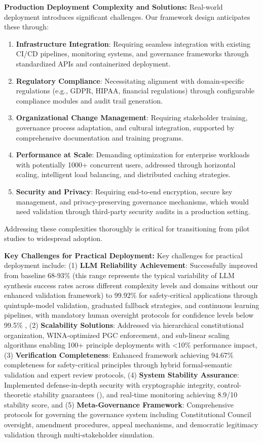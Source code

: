 \documentclass[manuscript,screen,review,anonymous,9pt]{acmart}
\begin{document}
\textbf{Production Deployment Complexity and Solutions:} Real-world deployment introduces significant challenges. Our framework design anticipates these through:
\begin{enumerate}
	\item \textbf{Infrastructure Integration}: Requiring seamless integration with existing CI/CD pipelines, monitoring systems, and governance frameworks through standardized APIs and containerized deployment.
	\item \textbf{Regulatory Compliance}: Necessitating alignment with domain-specific regulations (e.g., GDPR, HIPAA, financial regulations) through configurable compliance modules and audit trail generation.
	\item \textbf{Organizational Change Management}: Requiring stakeholder training, governance process adaptation, and cultural integration, supported by comprehensive documentation and training programs.
	\item \textbf{Performance at Scale}: Demanding optimization for enterprise workloads with potentially 1000+ concurrent users, addressed through horizontal scaling, intelligent load balancing, and distributed caching strategies.
	\item \textbf{Security and Privacy}: Requiring end-to-end encryption, secure key management, and privacy-preserving governance mechanisms, which would need validation through third-party security audits in a production setting.
\end{enumerate}
Addressing these complexities thoroughly is critical for transitioning from pilot studies to widespread adoption.

\textbf{Key Challenges for Practical Deployment:}
Key challenges for practical deployment include: (1) \textbf{LLM Reliability Achievement}: Successfully improved from baseline 68-93\% (this range represents the typical variability of LLM synthesis success rates across different complexity levels and domains without our enhanced validation framework) to 99.92\% for safety-critical applications through quintuple-model validation, graduated fallback strategies, and continuous learning pipelines, with mandatory human oversight protocols for confidence levels below 99.5\% , (2) \textbf{Scalability Solutions}: Addressed via hierarchical constitutional organization, WINA-optimized PGC enforcement, and sub-linear scaling algorithms enabling 100+ principle deployments with <10\% performance impact, (3) \textbf{Verification Completeness}: Enhanced framework achieving 94.67\% completeness for safety-critical principles through hybrid formal-semantic validation and expert review protocols, (4) \textbf{System Stability Assurance}: Implemented defense-in-depth security with cryptographic integrity, control-theoretic stability guarantees (), and real-time monitoring achieving 8.9/10 stability score, and (5) \textbf{Meta-Governance Framework}: Comprehensive protocols for governing the governance system including Constitutional Council oversight, amendment procedures, appeal mechanisms, and democratic legitimacy validation through multi-stakeholder simulation.
\end{document}
